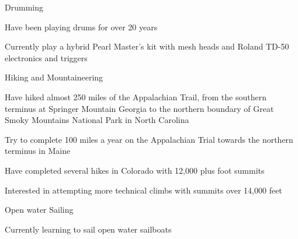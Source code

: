 
\begin{cventries}

\cventry
{Drumming} %
{} %
{} %
{} %
{
	\begin{cvitems} %
		\item {Have been playing drums for over 20 years}
		\item {Currently play a hybrid Pearl Master's kit with mesh heads and Roland TD-50 electronics and triggers}  
	\end{cvitems}
}


\cventry
{Hiking and Mountaineering } %
{} %
{} %
{} %
{
	\begin{cvitems} %
		\item {Have hiked almost 250 miles of the Appalachian Trail, from the southern terminus at Springer Mountain Georgia to the northern boundary of Great Smoky Mountains National Park in North Carolina}
		\item {Try to complete 100 miles a year on the Appalachian Trial towards the northern terminus in Maine}
		\item{Have completed several hikes in Colorado with 12,000 plus foot summits}
		\item{Interested in attempting more technical climbs with summits over 14,000 feet}  
	\end{cvitems}
}

\cventry
{Open water Sailing} %
{} %
{} %
{} %
{
	\begin{cvitems} %
		\item {Currently learning to sail open water sailboats}
	\end{cvitems}
}

\end{cventries}
